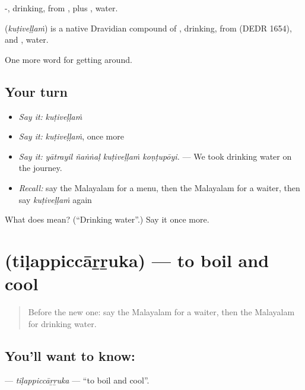 -, drinking, from , plus , water.

\begin{cousinweb}
\textbf{} (\emph{kuṭiveḷḷaṁ}) is a native Dravidian compound of , drinking, from  (DEDR 1654), and , water.
\end{cousinweb}

\begin{grammarlens}[title={What you've built}]
One more word for getting around.
\end{grammarlens}

\subsection*{Your turn}
\begin{itemize}
\raggedright
  \item \emph{Say it:} \emph{kuṭiveḷḷaṁ}
  \item \emph{Say it:} \emph{kuṭiveḷḷaṁ}, once more
  \item \emph{Say it:} \emph{yātrayil ñaṅṅaḷ kuṭiveḷḷaṁ koṇṭupōyi.} — We took drinking water on the journey.
  \item \emph{Recall:} say the Malayalam for a menu, then the Malayalam for a waiter, then say \emph{kuṭiveḷḷaṁ} again
\end{itemize}

\begin{tcolorbox}[breakable,colback=teal!4,colframe=teal!35!black,title={Before you move on}]
What does  mean? (\textquotedblleft{}Drinking water\textquotedblright{}.) Say it once more.
\end{tcolorbox}
\section[\texorpdfstring{\ml{തിളപ്പിച്ചാറ്റുക} (tiḷappiccāṟṟuka)}{തിളപ്പിച്ചാറ്റുക (tiḷappiccāṟṟuka)}]{ (tiḷappiccāṟṟuka) — to boil and cool}

\label{lesson:ML-C484-tilappiccarruka}



\begin{quote}
Before the new one: say the Malayalam for a waiter, then the Malayalam for drinking water.
\end{quote}

\subsection*{You'll want to know: }
\textbf{} — \emph{tiḷappiccāṟṟuka} — \textquotedblleft{}to boil and cool\textquotedblright{}.

